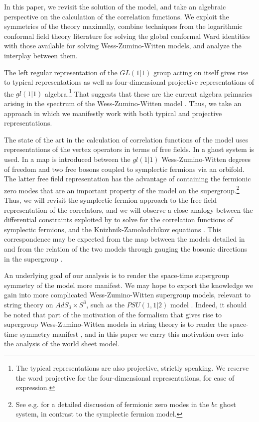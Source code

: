 \documentclass[12pt]{article}
\numberwithin{equation}{section}
\numberwithin{equation}{section}
\numberwithin{table}{section}\setlength{\multlinegap}{25pt}
\begin{document}
In this paper, we revisit the solution of the model, and take an  algebraic perspective on the calculation of the correlation
functions. We exploit the symmetries of the theory maximally, combine techniques
from the logarithmic conformal field theory literature for solving the global conformal Ward identities
 with those available for solving Wess-Zumino-Witten models,
and analyze the interplay between them.

The left regular representation of the $GL(1|1)$ group acting on itself gives rise
to typical representations as well as four-dimensional projective representations of the $gl(1|1)$ algebra.\footnote{The typical representations are also
projective, strictly speaking. We reserve the word projective for the four-dimensional representations, for ease of expression.}
  That 
suggests that these are the current algebra primaries arising in the spectrum
of the Wess-Zumino-Witten model  \cite{Schomerus:2005bf}. 
Thus, we take an approach in which we manifestly work with both  typical and projective representations.

The state of the art in the calculation of correlation functions of the
model uses representations of the vertex operators in terms of free
fields. In \cite{Schomerus:2005bf} a ghost system is used. In \cite{Creutzig:2008an}
a map is introduced between the $gl(1|1)$
Wess-Zumino-Witten degrees of freedom and two free bosons coupled to
symplectic fermions \cite{Kausch:2000fu} via an orbifold.  The latter free field
representation has the advantage of containing the fermionic zero
modes that are an important property of the model on the
supergroup.\footnote{See e.g. \cite{Flohr:2003tc} for a detailed discussion of fermionic zero modes in the $bc$ ghost system, in contrast to the
symplectic fermion model.}  Thus, we will revisit the symplectic fermion approach to the free field representation
of the correlators, and we will observe a close analogy between the differential constraints exploited by \cite{Gaberdiel:1998ps,Kausch:2000fu} to solve for 
the correlation functions of symplectic fermions, and the Knizhnik-Zamolodchikov equations \cite{Knizhnik:1984nr}.
This correspondence may be expected from the map between the models detailed in \cite{Creutzig:2008an} and from the relation of the two models through gauging 
the bosonic directions in the supergroup \cite{Creutzig:2011cu}.

An underlying goal of our analysis is to render the space-time
supergroup symmetry of the model more manifest. We may hope to  export the knowledge we gain into more complicated Wess-Zumino-Witten supergroup models,
relevant to string theory on $AdS_3 \times S^3$, such as the
$PSU(1,1|2)$ model \cite{Bershadsky:1999hk,Berkovits:1999im,Gotz:2006qp,Ashok:2009xx,Troost:2011fd,Gaberdiel:2011vf,Gerigk:2012cq}. Indeed, it should be noted that part of the motivation of the formalism that gives
rise to supergroup Wess-Zumino-Witten models in string theory is to render the space-time symmetry manifest \cite{Berkovits:1999im}, and in this paper we carry this motivation over into the
analysis of the world sheet model.
\end{document}

